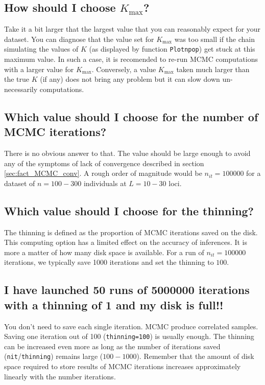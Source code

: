 \documentclass[a4paper,10pt]{article}
\begin{document}
\subsection{How should I choose $K_{\max}$?}\label{sec:faqKmax}

Take it a bit larger that the largest value that you can reasonably expect for your dataset. 
You can diagnose that the value set for $K_{\max}$ was too small if the chain simulating the values of $K$ (as displayed by function \texttt{Plotnpop})  
get stuck at this maximum value. In such a case, it is recomended to re-run MCMC computations with a larger value for $K_{\max}$.
Conversely, a value $K_{\max}$ taken much larger than the true $K$ (if any) does not bring any problem 
but it can slow down un-necessarily computations. 

\subsection[Number of iterations]{Which value should I choose for the number of MCMC iterations?}\label{sec:faqnit}
There is no obvious answer to that. The value should be large enough to avoid any of the symptoms of 
lack of convergence described in section \ref{sec:fact_MCMC_conv}. 
A rough order of magnitude would be $n_{it}=100000$ for a dataset of $n=100-300$ individuals at $L=10-30$ loci. 

\subsection[MCMC thinning]{Which value should I choose for the thinning?}\label{sec:faqthinning}
The thinning is defined as the proportion of MCMC iterations saved on the disk. 
This computing option has a limited effect on the accuracy of inferences. It is more a matter of how many disk space is available. 
For a run of  $n_{it}=100000$ iterations, we typically save 1000 iterations and set the thinning to $100$.  

\subsection[Storage]{I have launched 50 runs of  5000000 iterations with a thinning of 1 and my disk is full!!}

You don't need to save each single iteration. MCMC produce correlated samples. Saving one iteration out of 100 (\texttt{thinning=100}) 
is usually enough. 
The thinning can be increased even more as long as the number of iterations saved (\texttt{nit}/\texttt{thinning}) remains large ($100-1000$).
Remember that the amount of disk space required to store results of MCMC iterations increases approximately  linearly with the number iterations. 
\end{document}
